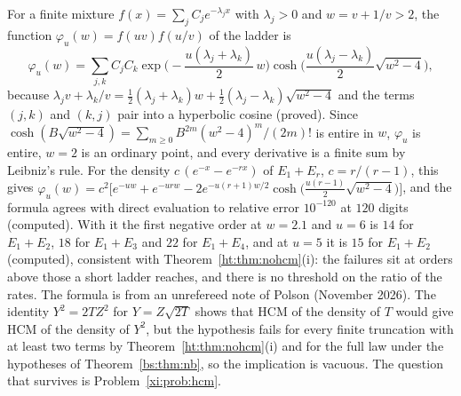 \begin{remark}\label{xi:rem:exact}
For a finite mixture $f(x)=\sum_jC_je^{-\lambda_jx}$ with $\lambda_j>0$ and $w=v+1/v>2$, the function $\varphi_u(w)=f(uv)f(u/v)$ of the ladder is
\[
\varphi_u(w)=\sum_{j,k}C_jC_k\exp\Big(-\frac{u(\lambda_j+\lambda_k)}2\,w\Big)\cosh\Big(\frac{u(\lambda_j-\lambda_k)}2\sqrt{w^2-4}\Big),
\]
because $\lambda_jv+\lambda_k/v=\frac12(\lambda_j+\lambda_k)w+\frac12(\lambda_j-\lambda_k)\sqrt{w^2-4}$ and the terms $(j,k)$ and $(k,j)$ pair into a hyperbolic cosine (proved). Since $\cosh(B\sqrt{w^2-4})=\sum_{m\ge0}B^{2m}(w^2-4)^m/(2m)!$ is entire in $w$, $\varphi_u$ is entire, $w=2$ is an ordinary point, and every derivative is a finite sum by Leibniz's rule. For the density $c\,(e^{-x}-e^{-rx})$ of $E_1+E_r$, $c=r/(r-1)$, this gives $\varphi_u(w)=c^2\big[e^{-uw}+e^{-urw}-2e^{-u(r+1)w/2}\cosh\big(\frac{u(r-1)}2\sqrt{w^2-4}\big)\big]$, and the formula agrees with direct evaluation to relative error $10^{-120}$ at $120$ digits (computed). With it the first negative order at $w=2.1$ and $u=6$ is $14$ for $E_1+E_2$, $18$ for $E_1+E_3$ and $22$ for $E_1+E_4$, and at $u=5$ it is $15$ for $E_1+E_2$ (computed), consistent with Theorem~\ref{ht:thm:nohcm}(i): the failures sit at orders above those a short ladder reaches, and there is no threshold on the ratio of the rates. The formula is from an unrefereed note of Polson (November 2026). The identity $Y^2=2TZ^2$ for $Y=Z\sqrt{2T}$ shows that HCM of the density of $T$ would give HCM of the density of $Y^2$, but the hypothesis fails for every finite truncation with at least two terms by Theorem~\ref{ht:thm:nohcm}(i) and for the full law under the hypotheses of Theorem~\ref{bs:thm:nb}, so the implication is vacuous. The question that survives is Problem~\ref{xi:prob:hcm}.
\end{remark}
